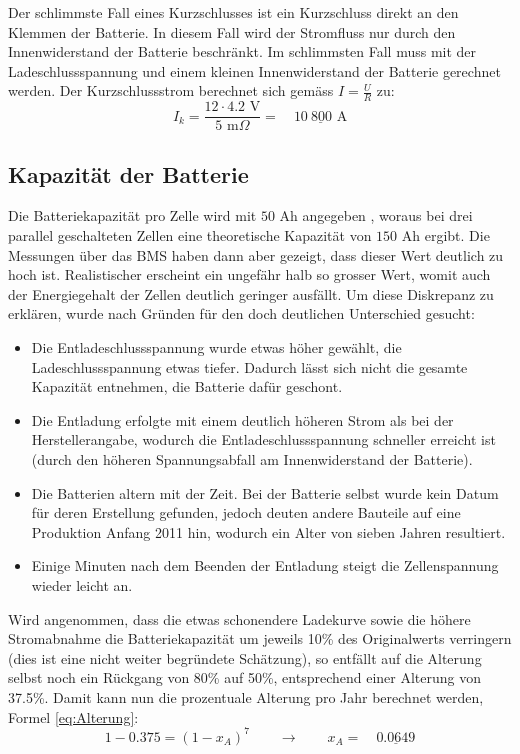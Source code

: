 Der schlimmste Fall eines Kurzschlusses ist ein Kurzschluss direkt an den Klemmen der Batterie. In diesem Fall wird der Stromfluss nur durch den Innenwiderstand der Batterie beschränkt. Im schlimmsten Fall muss mit der Ladeschlussspannung und einem kleinen Innenwiderstand der Batterie gerechnet werden. Der Kurzschlussstrom berechnet sich gemäss $I=\frac{U}{R}$ zu:
\begin{equation*}
	I_k=\frac{12\cdot 4.2\text{ V}}{5\text{ m}\Omega}=\quad\underline{10\ 800\text{ A}}
\end{equation*}

\subsection{Kapazität der Batterie}\label{sec:ah}
\color{blue}Die Batteriekapazität pro Zelle wird mit $50$ Ah angegeben \cite{lev50}, woraus bei drei parallel geschalteten Zellen eine theoretische Kapazität von $150$ Ah ergibt. Die Messungen über das BMS haben dann aber gezeigt, dass dieser Wert deutlich zu hoch ist. Realistischer erscheint ein ungefähr halb so grosser Wert, womit auch der Energiegehalt der Zellen deutlich geringer ausfällt. Um diese Diskrepanz zu erklären, wurde nach Gründen für den doch deutlichen Unterschied gesucht: \begin{itemize}
	\item Die Entladeschlussspannung wurde etwas höher gewählt, die Ladeschlussspannung etwas tiefer. Dadurch lässt sich nicht die gesamte Kapazität entnehmen, die Batterie dafür geschont.
	\item Die Entladung erfolgte mit einem deutlich höheren Strom als bei der Herstellerangabe, wodurch die Entladeschlussspannung schneller erreicht ist (durch den höheren Spannungsabfall am Innenwiderstand der Batterie).
	\item Die Batterien altern mit der Zeit. Bei der Batterie selbst wurde kein Datum für deren Erstellung gefunden, jedoch deuten andere Bauteile auf eine Produktion Anfang 2011 hin, wodurch ein Alter von sieben Jahren resultiert.
	\item Einige Minuten nach dem Beenden der Entladung steigt die Zellenspannung wieder leicht an.
\end{itemize}

Wird angenommen, dass die etwas schonendere Ladekurve sowie die höhere Stromabnahme die Batteriekapazität um jeweils 10\% des Originalwerts verringern (dies ist eine nicht weiter begründete Schätzung), so entfällt auf die Alterung selbst noch ein Rückgang von 80\% auf 50\%, entsprechend einer Alterung von 37.5\%. Damit kann nun die prozentuale Alterung pro Jahr berechnet werden, Formel \ref{eq:Alterung}:
\begin{equation}
	1-0.375=\left(1-x_A\right)^7\qquad\rightarrow\qquad x_A=\quad\underline{0.0649}
\label{eq:Alterung}
\end{equation}

